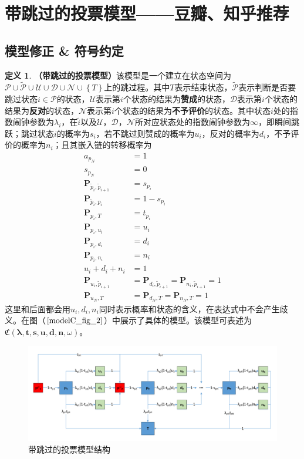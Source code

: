 \documentclass[UTF8]{ctexart}
\theoremstyle{plain}
\theoremstyle{definition}
\newtheorem{defn}{定义}[section]
\theoremstyle{remark}
\begin{document}
	\section{带跳过的投票模型——豆瓣、知乎推荐}
	\subsection{模型修正 \& 符号约定}
	\begin{defn}\textbf{（带跳过的投票模型）}该模型是一个建立在状态空间为$\mathcal{P} \cup \mathcal{\tilde{P}} \cup \mathcal{U} \cup \mathcal{D} \cup \mathcal{N} \cup \left\{T\right\}$上的跳过程。其中$T$表示结束状态，$\mathcal{\tilde{P}}$表示判断是否要跳过状态$i \in \mathcal{P}$的状态，$\mathcal{U}$表示第$i$个状态的结果为\textbf{赞成}的状态，$\mathcal{D}$表示第$i$个状态的结果为\textbf{反对}的状态，$\mathcal{N}$表示第$i$个状态的结果为\textbf{不予评价}的状态。其中状态$i$处的指数闹钟参数为$\lambda_i$，在$\tilde{i}$以及$\mathcal{U}$，$\mathcal{D}$，$\mathcal{N}$所对应状态处的指数闹钟参数为$\infty$，即瞬间跳跃；跳过状态$i$的概率为$s_i$，若不跳过则赞成的概率为$u_i$，反对的概率为$d_i$，不予评价的概率为$n_i$；且其嵌入链的转移概率为
	\begin{equation}
	\begin{aligned}
	a_{p_N} & = 1 \\
	s_{p_N} & = 0 \\
	\bm{P}_{\tilde{p}_i, \tilde{p}_{i+1}} & = s_{p_i} \\
	\bm{P}_{\tilde{p}_i, p_i} & = 1 - s_{p_i} \\
	\bm{P}_{p_i,T}  & = t_{p_i} \\
	\bm{P}_{p_i,u_i} & = u_i \\
	\bm{P}_{p_i,d_i} & = d_i \\
	\bm{P}_{p_i,n_i} & = n_i \\
	u_i + d_i + n_i & = 1\\
	\bm{P}_{u_i, \tilde{p}_{i+1}} & = \bm{P}_{d_i, \tilde{p}_{i+1}} = \bm{P}_{n_i, \tilde{p}_{i+1}} = 1 \\
	\bm{P}_{u_N, T} & = \bm{P}_{d_N, T} = \bm{P}_{n_N, T} = 1
	\end{aligned}
	\end{equation}
	这里和后面都会用$u_i,d_i,n_i$同时表示概率和状态的含义，在表达式中不会产生歧义。在图（$\ref{modelC_fig_2}$）中展示了具体的模型。该模型可表述为$\mathfrak{C}\left(\bm{\lambda}, \bm{t}, \bm{s}, \bm{u}, \bm{d}, \bm{n},\omega\right)$。
	\end{defn}
	\begin{figure}[h!] 
		\centering
		\includegraphics[width = 12cm]{modelC_fig_2.pdf}
		\caption{带跳过的投票模型结构}\label{modelC_fig_2}
	\end{figure}
	
\end{document}
